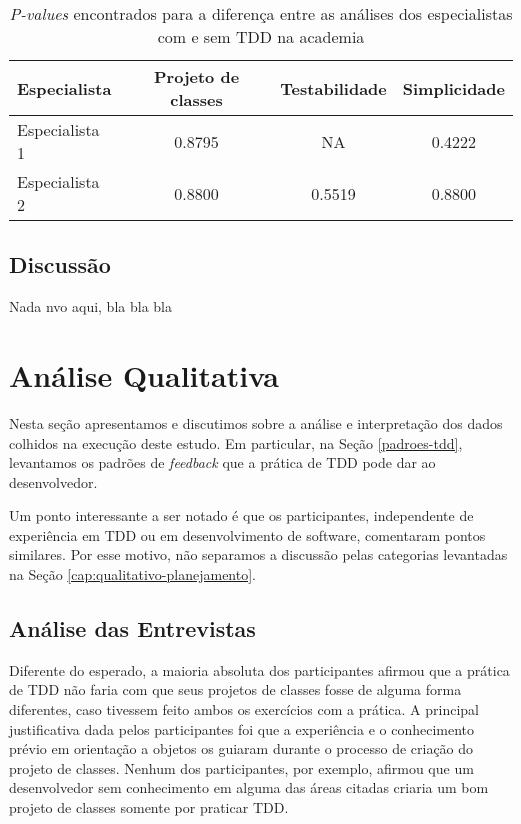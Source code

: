 \documentclass[conference]{IEEEtran}
\begin{document}
\begin{table}[h!]
	\centering
	\begin{tabular}{| p{2cm} | c | c | c | }
		\hline
		Especialista & Projeto de classes & Testabilidade & Simplicidade\\
		\hline
		Especialista 1	& 0.8795 &	NA	& 0.4222\\
		Especialista 2	& 0.8800	& 0.5519 &	0.8800\\
		\hline
	\end{tabular}
	\caption{\textit{P-values} encontrados para a diferença entre as análises dos especialistas com e sem TDD na academia}
	\label{tab:especialistas-academia}
\end{table}

\subsection{Discussão}

Nada nvo aqui, bla bla bla


\section{Análise Qualitativa}

Nesta seção apresentamos e discutimos sobre a análise e interpretação dos dados colhidos
na execução deste estudo. Em particular, na Seção 
\ref{padroes-tdd}, levantamos os padrões de \textit{feedback} que a prática de TDD
pode dar ao desenvolvedor.

Um ponto interessante a ser notado é que os participantes, independente de experiência
em TDD ou em desenvolvimento de software, comentaram pontos similares. Por esse motivo,
não separamos a discussão pelas categorias levantadas na Seção \ref{cap:qualitativo-planejamento}.

\subsection{Análise das Entrevistas}

Diferente do esperado, a maioria absoluta dos participantes afirmou que 
a prática de TDD não faria com que seus projetos de classes fosse de alguma forma diferentes, caso tivessem
feito ambos os exercícios com a prática.
A principal justificativa dada pelos participantes foi que a experiência e o conhecimento prévio
em orientação a objetos os guiaram durante o processo de criação do projeto de classes. Nenhum dos
participantes, por exemplo, afirmou que um desenvolvedor sem conhecimento em alguma das áreas
citadas criaria um bom projeto de classes somente por praticar TDD.
\end{document}
